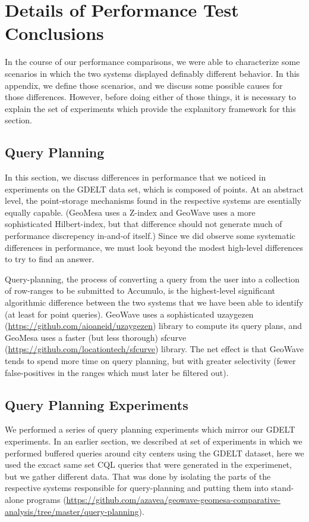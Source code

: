 \section{Details of Performance Test Conclusions}
\label{appendix:planning}

In the course of our performance comparisons, we were able to characterize some scenarios in which the two systems displayed definably different behavior.
In this appendix, we define those scenarios, and we discuss some possible causes for those differences.
However, before doing either of those things, it is necessary to explain the set of experiments which provide the explanitory framework for this section.

\subsection{Query Planning}

In this section, we discuss differences in performance that we noticed in experiments on the GDELT data set, which is composed of points.
At an abstract level, the point-storage mechanisms found in the respective systems are esentially equally capable.
(GeoMesa uses a Z-index and GeoWave uses a more sophisticated Hilbert-index, but that difference should not generate much of performance discrepency in-and-of itself.)
Since we did observe some systematic differences in performance, we must look beyond the modest high-level differences to try to find an answer.

Query-planning, the process of converting a query from the user into a collection of row-ranges to be submitted to Accumulo, is the highest-level significant algorithmic difference between the two systems that we have been able to identify (at least for point queries).
GeoWave uses a sophisticated uzaygezen (\url{https://github.com/aioaneid/uzaygezen}) library to compute its query plans,
and GeoMesa uses a faster (but less thorough) sfcurve (\url{https://github.com/locationtech/sfcurve}) library.
The net effect is that GeoWave tends to spend more time on query planning,
but with greater selectivity (fewer false-positives in the ranges which must later be filtered out).

\subsection{Query Planning Experiments}

We performed a series of query planning experiments which mirror our GDELT experiments.
In an earlier section, we described at set of experiments in which we performed buffered queries around city centers using the GDELT dataset, here we used the excact same set CQL queries that were generated in the experimenet, but we gather different data.
That was done by isolating the parts of the respective systems responsible for query-planning and putting them into stand-alone programs (\url{https://github.com/azavea/geowave-geomesa-comparative-analysis/tree/master/query-planning}).

